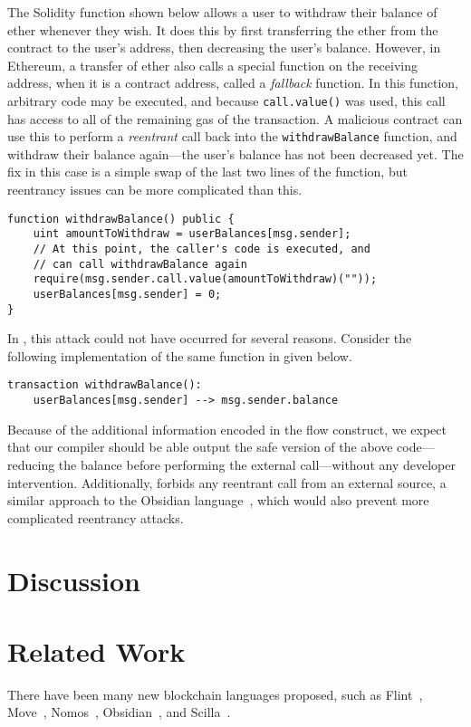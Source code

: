 \documentclass[dvipsnames, usenames, sigconf]{acmart}
\begin{document}
The Solidity function shown below allows a user to withdraw their balance of ether whenever they wish.
It does this by first transferring the ether from the contract to the user's address, then decreasing the user's balance.
However, in Ethereum, a transfer of ether also calls a special function on the receiving address, when it is a contract address, called a \emph{fallback} function.
In this function, arbitrary code may be executed, and because \lstinline{call.value()} was used, this call has access to all of the remaining gas of the transaction.
A malicious contract can use this to perform a \emph{reentrant} call back into the \lstinline{withdrawBalance} function, and withdraw their balance again---the user's balance has not been decreased yet.
The fix in this case is a simple swap of the last two lines of the function, but reentrancy issues can be more complicated than this.
\begin{lstlisting}[language=Solidity]
function withdrawBalance() public {
    uint amountToWithdraw = userBalances[msg.sender];
    // At this point, the caller's code is executed, and
    // can call withdrawBalance again
    require(msg.sender.call.value(amountToWithdraw)(""));
    userBalances[msg.sender] = 0;
}
\end{lstlisting}

In \langName, this attack could not have occurred for several reasons.
Consider the following implementation of the same function in \langName given below.
\begin{lstlisting}[language=flow]
transaction withdrawBalance():
    userBalances[msg.sender] --> msg.sender.balance
\end{lstlisting}
Because of the additional information encoded in the flow construct, we expect that our compiler should be able output the safe version of the above code---reducing the balance before performing the external call---without any developer intervention.
Additionally, \langName forbids any reentrant call from an external source, a similar approach to the Obsidian language~\cite{coblenz2019obsidian}, which would also prevent more complicated reentrancy attacks.

\section{Discussion}

\section{Related Work}
There have been many new blockchain languages proposed, such as Flint~\cite{schrans2018flint}, Move~\cite{blackshear2019move}, Nomos~\cite{das2019nomos}, Obsidian~\cite{coblenz2019obsidian}, and Scilla~\cite{sergey2018scilla}.
\end{document}

